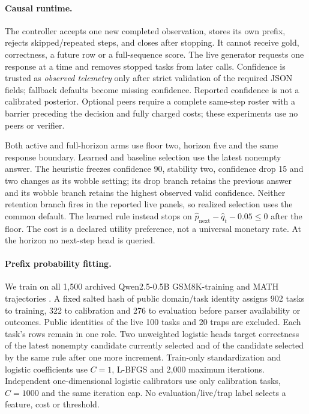 \documentclass{article}
\begin{document}
\paragraph{Causal runtime.}
The controller accepts one new completed observation, stores its own prefix,
rejects skipped/repeated steps, and closes after stopping. It cannot receive
gold, correctness, a future row or a full-sequence score. The live generator
requests one response at a time and removes stopped tasks from later calls.
Confidence is trusted as \emph{observed telemetry} only after strict validation
of the required JSON fields; fallback defaults become missing confidence.
Reported confidence is not a calibrated posterior. Optional peers require a
complete same-step roster with a barrier preceding the decision and fully
charged costs; these experiments use no peers or verifier.

Both active and full-horizon arms use floor two, horizon five and the same
response boundary. Learned and baseline selection use the latest nonempty
answer. The heuristic freezes confidence 90, stability two, confidence drop
15 and two changes as its wobble setting; its drop branch retains the previous
answer and its wobble branch retains the highest observed valid confidence.
Neither retention branch fires in the reported live panels, so realized
selection uses the common default.
The learned rule instead stops on
\(\widehat p_{\mathrm{next}}-\widehat q_t-0.05\le0\) after the floor. The cost is
a declared utility preference, not a universal monetary rate. At the horizon
no next-step head is queried.

\paragraph{Prefix probability fitting.}
We train on all 1,500 archived Qwen2.5-0.5B GSM8K-training and MATH trajectories
\citep{qwen2024}. A fixed salted hash of public domain/task identity assigns
902 tasks to training, 322 to calibration and 276 to evaluation before parser
availability or outcomes. Public identities of the live 100 tasks and 20 traps
are excluded. Each task's rows remain in one role. Two unweighted logistic
heads target correctness of the latest nonempty candidate currently selected
and of the candidate selected by the same rule after one more increment.
Train-only standardization and logistic coefficients use \(C=1\),
L-BFGS and 2,000 maximum iterations. Independent one-dimensional logistic
calibrators use only calibration tasks, \(C=1000\) and the same iteration cap.
No evaluation/live/trap label selects a feature, cost or threshold.
\end{document}
